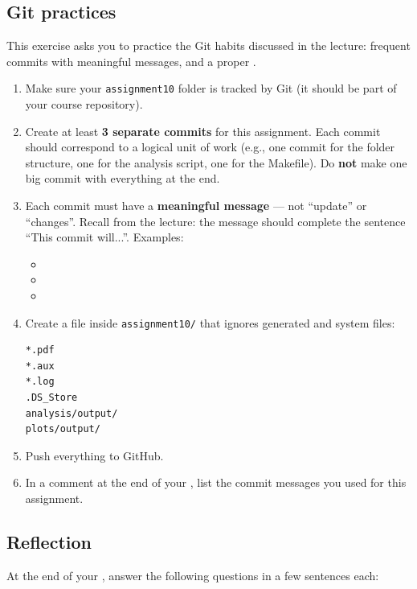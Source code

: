 \subsection{Git practices}

This exercise asks you to practice the Git habits discussed in the lecture: frequent commits with meaningful messages, and a proper .

\begin{enumerate}[label=\alph*)]
  \item Make sure your \texttt{assignment10} folder is tracked by Git (it should be part of your course repository).
  \item Create at least \textbf{3 separate commits} for this assignment. Each commit should correspond to a logical unit of work (e.g., one commit for the folder structure, one for the analysis script, one for the Makefile). Do \textbf{not} make one big commit with everything at the end.
  \item Each commit must have a \textbf{meaningful message} --- not ``update'' or ``changes''. Recall from the lecture: the message should complete the sentence ``This commit will...''. Examples:
  \begin{itemize}
    \item {}
    \item {}
    \item {}
  \end{itemize}
  \item Create a  file inside \texttt{assignment10/} that ignores generated and system files:
  \begin{lstlisting}
*.pdf
*.aux
*.log
.DS_Store
analysis/output/
plots/output/
  \end{lstlisting}
  \item Push everything to GitHub.
  \item In a comment at the end of your , list the commit messages you used for this assignment.
\end{enumerate}

\subsection{Reflection}

At the end of your , answer the following questions in a few sentences each:

